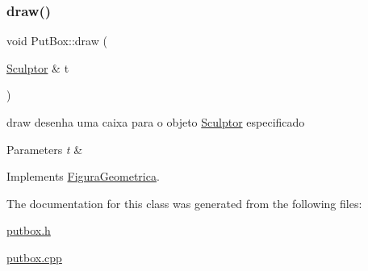 \subsubsection{\texorpdfstring{draw()}{draw()}}
{\footnotesize\ttfamily void Put\+Box\+::draw (\begin{DoxyParamCaption}\item[{\hyperlink{class_sculptor}{Sculptor} \&}]{t }\end{DoxyParamCaption})\hspace{0.3cm}{\ttfamily [virtual]}}



draw desenha uma caixa para o objeto \hyperlink{class_sculptor}{Sculptor} especificado 


\begin{DoxyParams}{Parameters}
{\em t} & \\
\hline
\end{DoxyParams}


Implements \hyperlink{class_figura_geometrica_a34585fd7c0bd7378fc69c4ee208e676c}{Figura\+Geometrica}.



The documentation for this class was generated from the following files\+:\begin{DoxyCompactItemize}
\item 
\hyperlink{putbox_8h}{putbox.\+h}\item 
\hyperlink{putbox_8cpp}{putbox.\+cpp}\end{DoxyCompactItemize}
